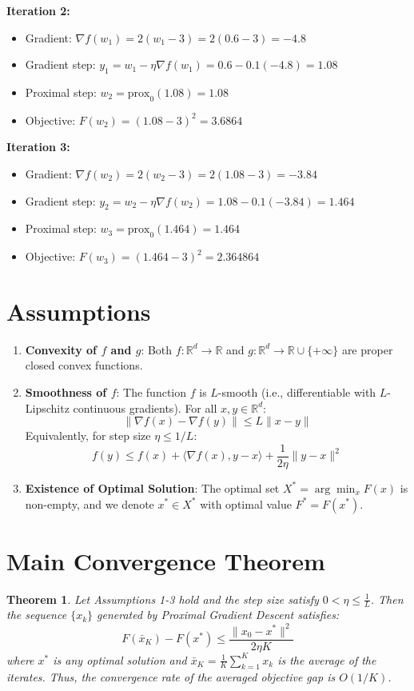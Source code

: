 \documentclass{article}
\newtheorem{theorem}{Theorem}
\begin{document}
\textbf{Iteration 2:}
\begin{itemize}
\item Gradient: $\nabla f(w_1) = 2(w_1 - 3) = 2(0.6 - 3) = -4.8$
\item Gradient step: $y_1 = w_1 - \eta \nabla f(w_1) = 0.6 - 0.1(-4.8) = 1.08$
\item Proximal step: $w_2 = \text{prox}_{0}(1.08) = 1.08$
\item Objective: $F(w_2) = (1.08 - 3)^2 = 3.6864$
\end{itemize}

\textbf{Iteration 3:}
\begin{itemize}
\item Gradient: $\nabla f(w_2) = 2(w_2 - 3) = 2(1.08 - 3) = -3.84$
\item Gradient step: $y_2 = w_2 - \eta \nabla f(w_2) = 1.08 - 0.1(-3.84) = 1.464$
\item Proximal step: $w_3 = \text{prox}_{0}(1.464) = 1.464$
\item Objective: $F(w_3) = (1.464 - 3)^2 = 2.364864$
\end{itemize}

\section*{Assumptions}
\begin{enumerate}
\item \textbf{Convexity of $f$ and $g$}: Both $f: \mathbb{R}^d \to \mathbb{R}$ and $g: \mathbb{R}^d \to \mathbb{R} \cup \{+\infty\}$ are proper closed convex functions.
\item \textbf{Smoothness of $f$}: The function $f$ is $L$-smooth (i.e., differentiable with $L$-Lipschitz continuous gradients). For all $x, y \in \mathbb{R}^d$:
\begin{equation}
\|\nabla f(x) - \nabla f(y)\| \leq L \|x - y\|
\end{equation}
Equivalently, for step size $\eta \leq 1/L$:
\begin{equation}
f(y) \leq f(x) + \langle \nabla f(x), y - x \rangle + \frac{1}{2\eta} \|y - x\|^2
\end{equation}
\item \textbf{Existence of Optimal Solution}: The optimal set $X^* = \arg\min_x F(x)$ is non-empty, and we denote $x^* \in X^*$ with optimal value $F^* = F(x^*)$.
\end{enumerate}

\section*{Main Convergence Theorem}
\begin{theorem}
Let Assumptions 1-3 hold and the step size satisfy $0 < \eta \leq \frac{1}{L}$. Then the sequence $\{x_k\}$ generated by Proximal Gradient Descent satisfies:
\begin{equation}
F(\bar{x}_K) - F(x^*) \leq \frac{\|x_0 - x^*\|^2}{2 \eta K}
\end{equation}
where $x^*$ is any optimal solution and $\bar{x}_K = \frac{1}{K}\sum_{k=1}^K x_k$ is the average of the iterates. Thus, the convergence rate of the averaged objective gap is $O(1/K)$.
\end{theorem}
\end{document}
